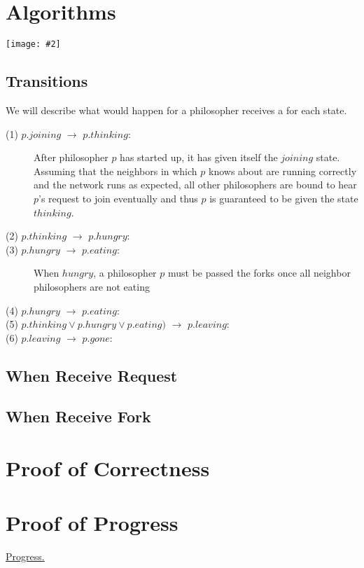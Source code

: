 \documentclass[11pt]{article}
\newcommand{\pic}[2]{\begin{center}\texttt{[image: \#2]}\end{center}}
\begin{document}
\section{Algorithms}
\pic{0.6}{diagram}

\subsection{Transitions}
We will describe what would happen for a philosopher receives a for each state.
\begin{description}
\item[(1) $p.joining$ $\to$ $p.thinking$:] After philosopher $p$ has started up, it has given itself the $joining$ state. Assuming that the neighbors in which $p$ knows about are running correctly and the network runs as expected, all other philosophers are bound to hear $p$'s request to join eventually and thus $p$ is guaranteed to be given the state $thinking$.

\item[(2) $p.thinking$ $\to$ $p.hungry$:]

\item[(3) $p.hungry$ $\to$ $p.eating$:] When $hungry$, a philosopher $p$ must be passed the forks once all neighbor philosophers are not eating

\item[(4) $p.hungry$ $\to$ $p.eating$:]

\item[(5) $p.thinking \vee p.hungry \vee p.eating)$ $\to$ $p.leaving$:]

\item[(6) $p.leaving$ $\to$ $p.gone$:]
\end{description}
\subsection{When Receive Request}
\subsection{When Receive Fork}

\section{Proof of Correctness}

\section{Proof of Progress}
\underline{\large{Progress.}}
\end{document}
